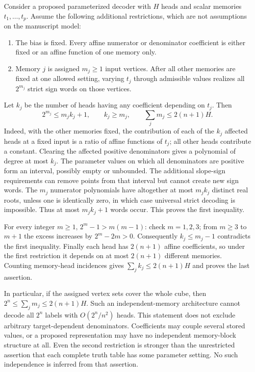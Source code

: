 \documentclass[11pt]{article}
\begin{document}
Consider a proposed parameterized decoder with $H$ heads and scalar
memories $t_1,\ldots,t_p$. Assume the following additional restrictions,
which are not assumptions on the manuscript model:
\begin{enumerate}
\item The bias is fixed. Every affine numerator or denominator
coefficient is either fixed or an affine function of one memory only.
\item Memory $j$ is assigned $m_j\ge1$ input vertices. After all other
memories are fixed at one allowed setting, varying $t_j$ through
admissible values realizes all $2^{m_j}$ strict sign words on those
vertices.
\end{enumerate}
Let $k_j$ be the number of heads having any coefficient depending on
$t_j$. Then
\[
 2^{m_j}\le m_jk_j+1,\qquad k_j\ge m_j,
 \qquad \sum_jm_j\le2(n+1)H.
\]
Indeed, with the other memories fixed, the contribution of each of the
$k_j$ affected heads at a fixed input is a ratio of affine functions of
$t_j$; all other heads contribute a constant. Clearing the affected
positive denominators gives a polynomial of degree at most $k_j$.
The parameter values on which all denominators are positive form an
interval, possibly empty or unbounded. The additional slope-sign
requirements can remove points from that interval but cannot create
new sign words. The $m_j$ numerator polynomials have altogether at
most $m_jk_j$ distinct real roots, unless one is identically zero,
in which case universal strict decoding is impossible. Thus at most
$m_jk_j+1$ words occur. This proves the first inequality.

For every integer $m\ge1$, $2^m-1>m(m-1)$: check $m=1,2,3$;
from $m\ge3$ to $m+1$ the excess increases by $2^m-2m>0$.
Consequently $k_j\le m_j-1$ contradicts the first inequality.
Finally each head has $2(n+1)$ affine coefficients, so under the
first restriction it depends on at most $2(n+1)$ different memories.
Counting memory-head incidences gives
$\sum_jk_j\le2(n+1)H$ and proves the last assertion.

In particular, if the assigned vertex sets cover the whole cube, then
$2^n\le\sum_jm_j\le2(n+1)H$. Such an independent-memory architecture
cannot decode all $2^n$ labels with $O(2^n/n^2)$ heads.
This statement does not exclude
arbitrary target-dependent denominators. Coefficients may couple several
stored values, or a proposed representation may have no independent
memory-block structure at all. Even the second restriction is stronger
than the unrestricted assertion that each complete truth table has
some parameter setting. No such independence is inferred from that
assertion.
\end{document}
